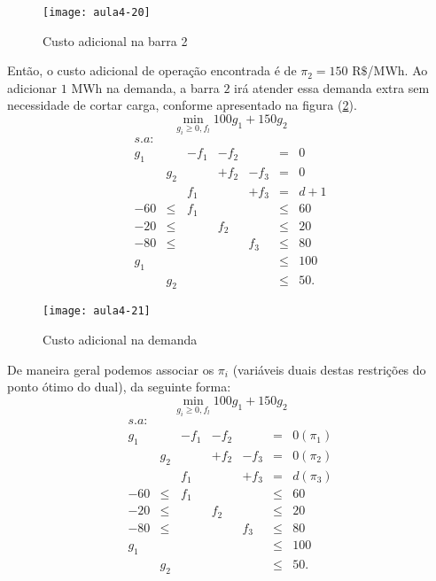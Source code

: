 \begin{figure}[H]
\begin{centering}
\texttt{[image: aula4-20]}\protect\caption{\label{fig:aula4-20} Custo adicional na barra 2}
\end{centering}
\end{figure}

Então, o custo adicional de operação encontrada é de  $\pi_{2}=150$ R$\$$/MWh.
Ao adicionar $1$ MWh na demanda, a barra $2$ irá atender essa demanda extra sem necessidade de cortar carga, conforme apresentado na figura (\ref{fig:aula4-21}).
\[
\min_{g_{i}\geq0,f_{l}}100g_{1}+150g_{2}
\]
\[
\begin{array}{ccccccc}
s.a:\\
g_{1} &  & -f_{1} & -f_{2} &  & = & 0\\
 & g_{2} &  & +f_{2} & -f_{3} & = & 0\\
 &  & f_{1} &  & +f_{3} & = & d+1\\
-60 & \leq & f_{1} &  &  & \leq & 60\\
-20 & \leq &  & f_{2} &  & \leq & 20\\
-80 & \leq &  &  & f_{3} & \leq & 80\\
g_{1} &  &  &  &  & \leq & 100\\
 & g_{2} &  &  &  & \leq & 50.
\end{array}
\]

\begin{figure}[H]
\begin{centering}
\texttt{[image: aula4-21]}\protect\caption{\label{fig:aula4-21} Custo adicional na demanda}
\end{centering}
\end{figure}

De maneira geral podemos associar os  $\pi_{i}$ (variáveis duais destas restrições do ponto ótimo do dual), da seguinte forma:
\[
\min_{g_{i}\geq0,f_{l}}100g_{1}+150g_{2}
\]
\[
\begin{array}{ccccccc}
s.a:\\
g_{1} &  & -f_{1} & -f_{2} &  & = & 0 (\pi_{1}) \\
 & g_{2} &  & +f_{2} & -f_{3} & = & 0 (\pi_{2})\\
 &  & f_{1} &  & +f_{3} & = & d (\pi_{3})\\
-60 & \leq & f_{1} &  &  & \leq & 60\\
-20 & \leq &  & f_{2} &  & \leq & 20\\
-80 & \leq &  &  & f_{3} & \leq & 80\\
g_{1} &  &  &  &  & \leq & 100\\
 & g_{2} &  &  &  & \leq & 50.
\end{array}
\]

